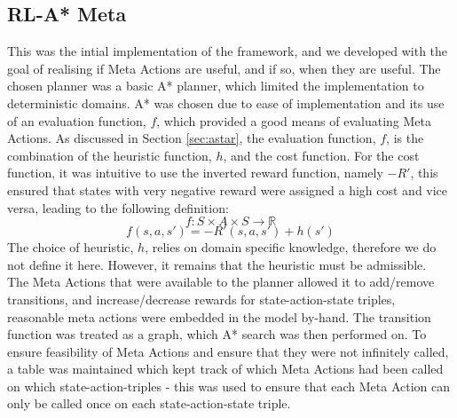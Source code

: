 \subsection{RL-A* Meta}
This was the intial implementation of the framework, and we developed with the goal of realising if Meta Actions are useful, and if so, when they are useful. The chosen planner was a basic A* planner, which limited the implementation to deterministic domains. A* was chosen due to ease of implementation and its use of an evaluation function, $f$, which provided a good means of evaluating Meta Actions. As discussed in Section \ref{sec:astar}, the evaluation function, $f$, is the combination of the heuristic function, $h$, and the cost function.
For the cost function,  it was intuitive to use the inverted reward function, namely $-R'$, this ensured that states with very negative reward were assigned a high cost and vice versa, leading to the following definition:
\begin{equation}
\label{eqn:astareval}
f : S \times A \times S \rightarrow \mathbb{R}
\end{equation}
\begin{equation}
\label{eqn:astarevalsas}
f(s,a,s') = -R'(s, a, s') + h(s')
\end{equation}
The choice of heuristic, $h$, relies on domain specific knowledge, therefore we do not define it here. However,  it remains that the heuristic must be admissible.
\\The Meta Actions that were available to the planner allowed it to add/remove transitions, and increase/decrease rewards for state-action-state triples, reasonable meta actions were embedded in the model by-hand. The transition function was treated as a graph, which A* search was then performed on. To ensure feasibility of Meta Actions and ensure that they were not infinitely called, a table was maintained which kept track of which Meta Actions had been called on which state-action-triples - this was used to ensure that each Meta Action can only be called once on each state-action-state triple. 
